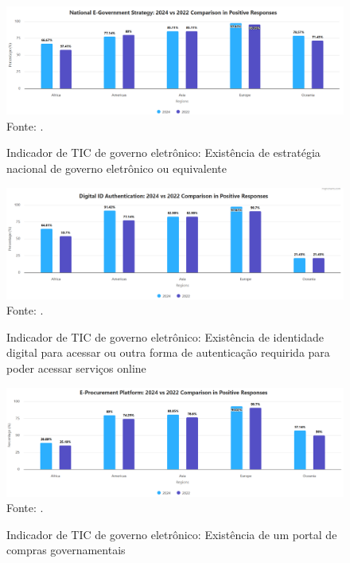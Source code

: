 \begin{figure}[H]
	\centering
	\caption{Indicador de TIC de governo eletrônico: Existência de estratégia nacional de governo eletrônico ou equivalente}
	\includegraphics[width=1\linewidth]{figuras/national_government_strategy}
	\label{fig:national_government_strategy}
	\footnotesize{Fonte: \cite{ONU_ICT_in_government_indicators}.}
\end{figure}

\begin{figure}[H]
	\centering
	\caption{Indicador de TIC de governo eletrônico: Existência de identidade digital para acessar ou outra forma de autenticação requirida para poder acessar serviços online}
	\includegraphics[width=1\linewidth]{figuras/digital_identity}
	\label{fig:national_identity}
	\footnotesize{Fonte: \cite{ONU_ICT_in_government_indicators}.}
\end{figure}

\begin{figure}[H]
	\centering
	\caption{Indicador de TIC de governo eletrônico: Existência de um portal de compras governamentais}
	\includegraphics[width=1\linewidth]{figuras/procurement_portal}
	\label{fig:procurement_portal}
	\footnotesize{Fonte: \cite{ONU_ICT_in_government_indicators}.}
\end{figure}

